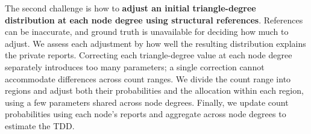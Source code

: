 The second challenge is how to \textbf{adjust an initial triangle-degree distribution at each node degree using structural references}.
References can be inaccurate, and ground truth is unavailable for deciding how much to adjust.
We assess each adjustment by how well the resulting distribution explains the private reports.
Correcting each triangle-degree value at each node degree separately introduces too many parameters; a single correction cannot accommodate differences across count ranges.
We divide the count range into regions and adjust both their probabilities and the allocation within each region, using a few parameters shared across node degrees.
Finally, we update count probabilities using each node's reports and aggregate across node degrees to estimate the TDD.


